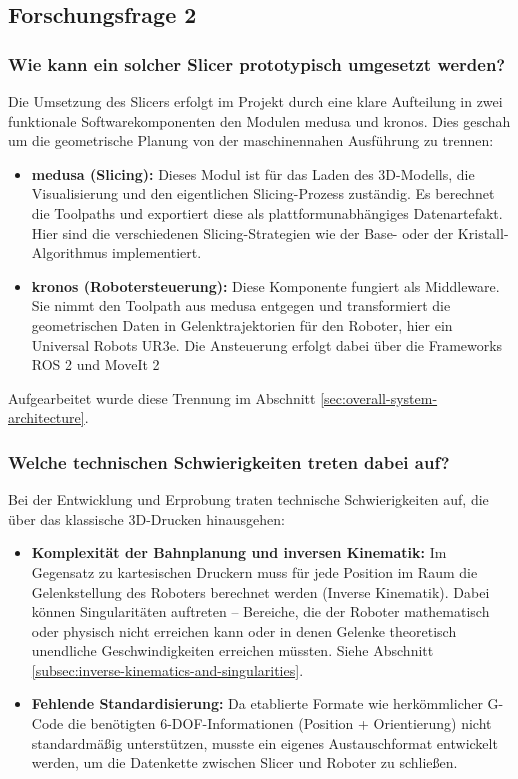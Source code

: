     \subsection{Forschungsfrage 2}
      \subsubsection{Wie kann ein solcher Slicer prototypisch umgesetzt werden?}
        Die Umsetzung des Slicers erfolgt im Projekt durch eine klare Aufteilung in zwei funktionale Softwarekomponenten den Modulen \ac{medusa} und \ac{kronos}.
        Dies geschah um die geometrische Planung von der maschinennahen Ausführung zu trennen:
        \begin{itemize}
        \item \textbf{\acs{medusa} (Slicing):} Dieses Modul ist für das Laden des 3D-Modells, die Visualisierung und den eigentlichen Slicing-Prozess zuständig.
        Es berechnet die Toolpaths und exportiert diese als plattformunabhängiges Datenartefakt.
        Hier sind die verschiedenen Slicing-Strategien wie der Base- oder der Kristall-Algorithmus implementiert.
        \item \textbf{\acs{kronos} (Robotersteuerung):} Diese Komponente fungiert als Middleware.
        Sie nimmt den Toolpath aus \ac{medusa} entgegen und transformiert die geometrischen Daten in Gelenktrajektorien für den Roboter, hier ein Universal Robots UR3e.
        Die Ansteuerung erfolgt dabei über die Frameworks ROS 2 und MoveIt 2
        \end{itemize}
        Aufgearbeitet wurde diese Trennung im Abschnitt \ref{sec:overall-system-architecture}.
        
      \subsubsection{Welche technischen Schwierigkeiten treten dabei auf?}
        Bei der Entwicklung und Erprobung traten technische Schwierigkeiten auf, die über das klassische 3D-Drucken hinausgehen:
        \begin{itemize}
        \item \textbf{Komplexität der Bahnplanung und inversen Kinematik:} Im Gegensatz zu kartesischen Druckern muss für jede Position im Raum die Gelenkstellung des Roboters berechnet werden (Inverse Kinematik).
        Dabei können Singularitäten auftreten – Bereiche, die der Roboter mathematisch oder physisch nicht erreichen kann oder in denen Gelenke theoretisch unendliche Geschwindigkeiten erreichen müssten.
        Siehe Abschnitt \ref{subsec:inverse-kinematics-and-singularities}.
        \item \textbf{Fehlende Standardisierung:} Da etablierte Formate wie herkömmlicher G-Code die benötigten 6-\ac{DOF}-Informationen (Position + Orientierung) nicht standardmäßig unterstützen, musste ein eigenes Austauschformat entwickelt werden, um die Datenkette zwischen Slicer und Roboter zu schließen.
        \end{itemize}

